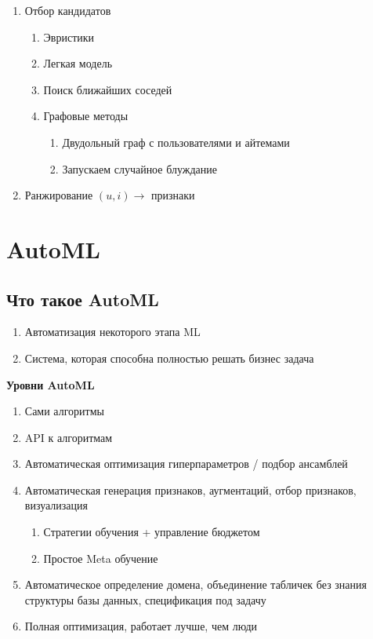 \documentclass[a4paper, 12pt]{article}
\begin{document}
\begin{enumerate}
    \item Отбор кандидатов
    \begin{enumerate}
        \item Эвристики
        \item Легкая модель
        \item Поиск ближайших соседей
        \item Графовые методы
        \begin{enumerate}
            \item Двудольный граф с пользователями и айтемами
            \item Запускаем случайное блуждание
        \end{enumerate}
    \end{enumerate}
    \item Ранжирование
    $(u, i) \rightarrow$ признаки
\end{enumerate}

\section{AutoML}

\subsection{Что такое AutoML}

\begin{enumerate}
    \item Автоматизация некоторого этапа ML
    \item Система, которая способна полностью решать бизнес задача
\end{enumerate}

\textbf{Уровни AutoML}

\begin{enumerate}
    \item Сами алгоритмы
    \item API к алгоритмам
    \item Автоматическая оптимизация гиперпараметров / подбор ансамблей
    \item Автоматическая генерация признаков, 
    аугментаций, отбор признаков, визуализация
    \begin{enumerate}
        \item Стратегии обучения + управление бюджетом
        \item Простое Meta обучение
    \end{enumerate}
    \item Автоматическое определение домена, 
    объединение табличек без знания структуры базы данных, 
    спецификация под задачу
    \item Полная оптимизация, работает лучше, чем люди
\end{enumerate}
\end{document}
